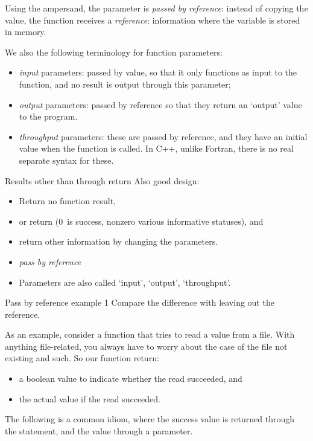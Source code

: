 Using the ampersand, the parameter is
\emph{passed by reference}:
instead of copying the value, the function receives a \emph{reference}:
information where the variable is stored in memory.

We also the following terminology for function parameters:
\begin{itemize}
\item \emph{input} parameters: passed by
  value, so that it only functions as input to the function, and no
  result is output through this parameter;
\item \emph{output} parameters: passed
  by reference so that they return an `output' value to the program.
\item \emph{throughput} parameters:
  these are passed by reference, and they have an initial value when
  the function is called. In C++, unlike Fortran, there is no real
  separate syntax for these.
\end{itemize}

\begin{slide}{Results other than through return}
  \label{sl:func-err-return}
  Also good design:
  \begin{itemize}
  \item Return no function result,
  \item or return  (0~is success, nonzero various
    informative statuses), and
  \item return other information by changing the parameters.
  \item \emph{pass by reference}
  \item Parameters are also called `input', `output', `throughput'.
  \end{itemize}
\end{slide}

\begin{block}{Pass by reference example 1}
  \label{sl:pass-reference1}
  Compare the difference with leaving out the reference.
\end{block}

As an example, consider a function that tries to read a value from a
file. With anything file-related, you always have to worry about the
case of the file not existing and such. So our function return:
\begin{itemize}
\item a boolean value to indicate whether the read succeeded, and
\item the actual value if the read succeeded.
\end{itemize}
The following is a common idiom, where the success value is returned
through the  statement, and the value through a parameter.

